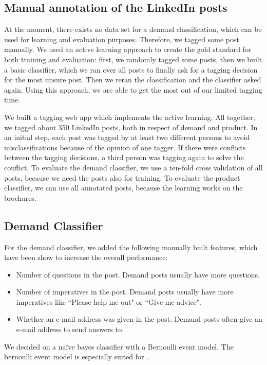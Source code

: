 \subsection{Manual annotation of the LinkedIn posts}

At the moment, there exists no data set for a demand classification, which can be used for learning and evaluation purposes.
Therefore, we tagged some post manually.
We used an active learning \nr approach to create the gold standard for both training and evaluation:
first, we randomly tagged some posts, then we built a basic classifier, which we ran over all posts to finally ask for a tagging decision for the most unsure post.
Then we reran the classification and the classifier asked again.
Using this approach, we are able to get the most out of our limited tagging time.

We built a tagging web app which implements the active learning.
All together, we tagged about 350 LinkedIn posts, both in respect of demand and product.
In an initial step, each post was tagged by at least two different persons to avoid misclassifications  because of the opinion of one tagger.
If there were conflicts between the tagging decisions, a third person was tagging again to solve the conflict.
To evaluate the demand classifier, we use a ten-fold cross validation of all posts, because we need the posts also for training.
To evaluate the product classifier, we can use all annotated posts, because the learning works on the brochures.

\subsection{Demand Classifier}
For the demand classifier, we added the following manually built features, which have been show to increase the overall performance:
\begin{itemize}
	\item Number of questions in the post. Demand posts usually have more questions.
	\item Number of imperatives in the post. Demand posts usually have more imperatives like ``Please help me out" or ``Give me advice".
	\item Whether an e-mail address was given in the post. Demand posts often give an e-mail address to send answers to.
\end{itemize}

We decided on a na\"{i}ve bayes classifier with a Bernoulli event model.
The bernoulli event model is especially suited for .

